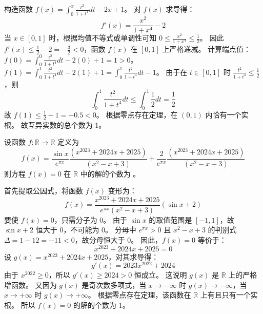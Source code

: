 \begin{questions}
\begin{solution}
构造函数 $f(x) = \int_{0}^{x} \frac{t^2}{1+t^4} dt - 2x + 1$。
对 $f(x)$ 求导得：
\[
f'(x) = \frac{x^2}{1+x^4} - 2
\]
当 $x \in [0, 1]$ 时，根据均值不等式或单调性可知 $0 \le \frac{x^2}{1+x^4} \le \frac{1}{2}$。
因此 $f'(x) \le \frac{1}{2} - 2 = -\frac{3}{2} < 0$，函数 $f(x)$ 在 $[0, 1]$ 上严格递减。
计算端点值：
$f(0) = \int_{0}^{0} \frac{t^2}{1+t^4} dt - 2(0) + 1 = 1 > 0$。
$f(1) = \int_{0}^{1} \frac{t^2}{1+t^4} dt - 2(1) + 1 = \int_{0}^{1} \frac{t^2}{1+t^4} dt - 1$。
由于在 $t \in [0, 1]$ 时 $\frac{t^2}{1+t^4} \le \frac{1}{2}$，则
\[
\int_{0}^{1} \frac{t^2}{1+t^4} dt \le \int_{0}^{1} \frac{1}{2} dt = \frac{1}{2}
\]
故 $f(1) \le \frac{1}{2} - 1 = -0.5 < 0$。
根据零点存在定理，在 $(0, 1)$ 内恰有一个实根。
故互异实数的总个数为 1。
\end{solution}
    \question 设函数 $f : \mathbb{R} \to \mathbb{R}$ 定义为
\[
f(x) = \frac{\sin x}{e^{\pi x}} \frac{(x^{2023} + 2024x + 2025)}{(x^2 - x + 3)} + \frac{2}{e^{\pi x}} \frac{(x^{2023} + 2024x + 2025)}{(x^2 - x + 3)}
\]
则方程 $f(x) = 0$ 在 $\mathbb{R}$ 中的解的个数为 \underline{\hspace{2cm}}。

\begin{solution}
首先提取公因式，将函数 $f(x)$ 变形为：
\[
f(x) = \frac{x^{2023} + 2024x + 2025}{e^{\pi x}(x^2 - x + 3)} (\sin x + 2)
\]
要使 $f(x) = 0$，只需分子为 0。
由于 $\sin x$ 的取值范围是 $[-1, 1]$，故 $\sin x + 2$ 恒大于 0，不可能为 0。
分母中 $e^{\pi x} > 0$ 且 $x^2 - x + 3$ 的判别式 $\Delta = 1 - 12 = -11 < 0$，故分母恒大于 0。
因此，$f(x) = 0$ 等价于：
\[
x^{2023} + 2024x + 2025 = 0
\]
设 $g(x) = x^{2023} + 2024x + 2025$，对其求导得：
\[
g'(x) = 2023x^{2022} + 2024
\]
由于 $x^{2022} \ge 0$，所以 $g'(x) \ge 2024 > 0$ 恒成立。
这说明 $g(x)$ 是 $\mathbb{R}$ 上的严格增函数。
又因为 $g(x)$ 是奇次数多项式，当 $x \to -\infty$ 时 $g(x) \to -\infty$，当 $x \to +\infty$ 时 $g(x) \to +\infty$。
根据零点存在定理，该函数在 $\mathbb{R}$ 上有且只有一个实根。
所以 $f(x) = 0$ 的解的个数为 1。
\end{solution}


\end{questions}

